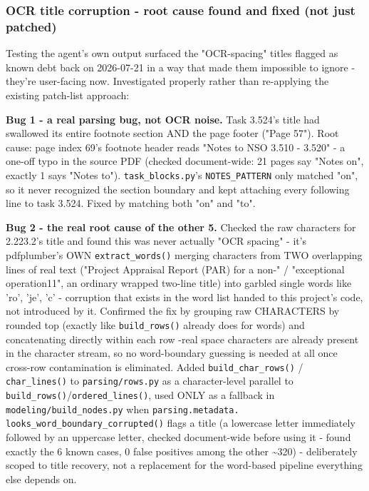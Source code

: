\subsubsection*{OCR title corruption - root cause found and fixed (not just patched)}
Testing the agent's own output surfaced the "OCR-spacing" titles flagged as known debt back on 2026-07-21 in a way that made them impossible to ignore - they're user-facing now. Investigated properly rather than re-applying the existing patch-list approach:

\textbf{Bug 1 - a real parsing bug, not OCR noise.} Task 3.524's title had swallowed its entire footnote section AND the page footer ("Page 57"). Root cause: page index 69's footnote header reads "Notes to NSO 3.510 - 3.520" - a one-off typo in the source PDF (checked document-wide: 21 pages say "Notes on", exactly 1 says "Notes to"). \texttt{task\_\allowbreak{}blocks.py}'s \texttt{NOTES\_\allowbreak{}PATTERN} only matched "on", so it never recognized the section boundary and kept attaching every following line to task 3.524. Fixed by matching both "on" and "to".

\textbf{Bug 2 - the real root cause of the other 5.} Checked the raw characters for 2.223.2's title and found this was never actually "OCR spacing" - it's pdfplumber's OWN \texttt{extract\_\allowbreak{}words()} merging characters from TWO overlapping lines of real text ("Project Appraisal Report (PAR) for a non-" / "exceptional operation11", an ordinary wrapped two-line title) into garbled single words like 'ro', 'je', 'c' - corruption that exists in the word list handed to this project's code, not introduced by it. Confirmed the fix by grouping raw CHARACTERS by rounded top (exactly like \texttt{build\_\allowbreak{}rows()} already does for words) and concatenating directly within each row -real space characters are already present in the character stream, so no word-boundary guessing is needed at all once cross-row contamination is eliminated. Added \texttt{build\_\allowbreak{}char\_\allowbreak{}rows()} / \texttt{char\_\allowbreak{}lines()} to \texttt{parsing/\allowbreak{}rows.py} as a character-level parallel to \texttt{build\_\allowbreak{}rows()}/\texttt{ordered\_\allowbreak{}lines()}, used ONLY as a fallback in \texttt{modeling/\allowbreak{}build\_\allowbreak{}nodes.py} when \texttt{parsing.metadata. looks\_\allowbreak{}word\_\allowbreak{}boundary\_\allowbreak{}corrupted()} flags a title (a lowercase letter immediately followed by an uppercase letter, checked document-wide before using it - found exactly the 6 known cases, 0 false positives among the other \textasciitilde{}320) - deliberately scoped to title recovery, not a replacement for the word-based pipeline everything else depends on.

